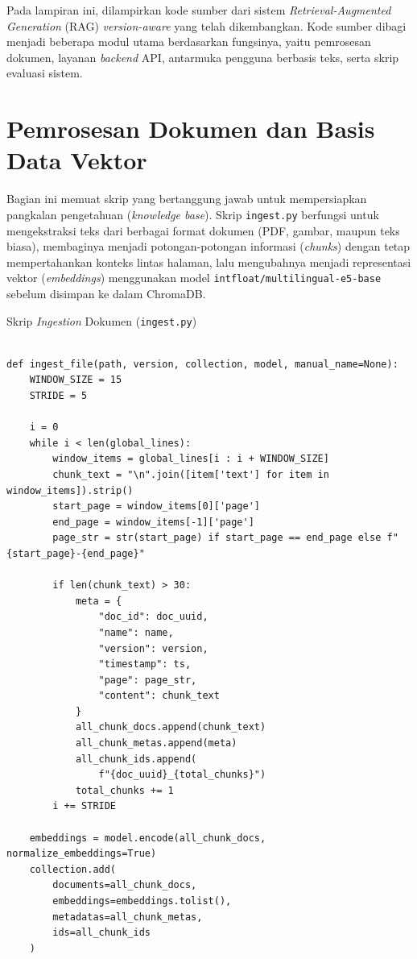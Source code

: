 \label{lampiran:kode_rag}

Pada lampiran ini, dilampirkan kode sumber dari sistem \textit{Retrieval-Augmented Generation} (RAG) \textit{version-aware} yang telah dikembangkan. Kode sumber dibagi menjadi beberapa modul utama berdasarkan fungsinya, yaitu pemrosesan dokumen, layanan \textit{backend} API, antarmuka pengguna berbasis teks, serta skrip evaluasi sistem.

\section{Pemrosesan Dokumen dan Basis Data Vektor}

Bagian ini memuat skrip yang bertanggung jawab untuk mempersiapkan pangkalan pengetahuan (\textit{knowledge base}). Skrip \texttt{ingest.py} berfungsi untuk mengekstraksi teks dari berbagai format dokumen (PDF, gambar, maupun teks biasa), membaginya menjadi potongan-potongan informasi (\textit{chunks}) dengan tetap mempertahankan konteks lintas halaman, lalu mengubahnya menjadi representasi vektor (\textit{embeddings}) menggunakan model \texttt{intfloat/multilingual-e5-base} sebelum disimpan ke dalam ChromaDB.

\begin{myblock}{Skrip \textit{Ingestion} Dokumen (\texttt{ingest.py})}\label{kode:ingest}
\begin{verbatim}

def ingest_file(path, version, collection, model, manual_name=None):
    WINDOW_SIZE = 15   
    STRIDE = 5        
    
    i = 0
    while i < len(global_lines):
        window_items = global_lines[i : i + WINDOW_SIZE]
        chunk_text = "\n".join([item['text'] for item in window_items]).strip()
        start_page = window_items[0]['page']
        end_page = window_items[-1]['page']
        page_str = str(start_page) if start_page == end_page else f"{start_page}-{end_page}"
        
        if len(chunk_text) > 30:
            meta = {
                "doc_id": doc_uuid,
                "name": name,             
                "version": version,
                "timestamp": ts,
                "page": page_str,
                "content": chunk_text
            }
            all_chunk_docs.append(chunk_text)
            all_chunk_metas.append(meta)
            all_chunk_ids.append(
                f"{doc_uuid}_{total_chunks}")
            total_chunks += 1
        i += STRIDE

    embeddings = model.encode(all_chunk_docs, normalize_embeddings=True)
    collection.add(
        documents=all_chunk_docs,
        embeddings=embeddings.tolist(),
        metadatas=all_chunk_metas,
        ids=all_chunk_ids
    )
\end{verbatim}
\end{myblock}

